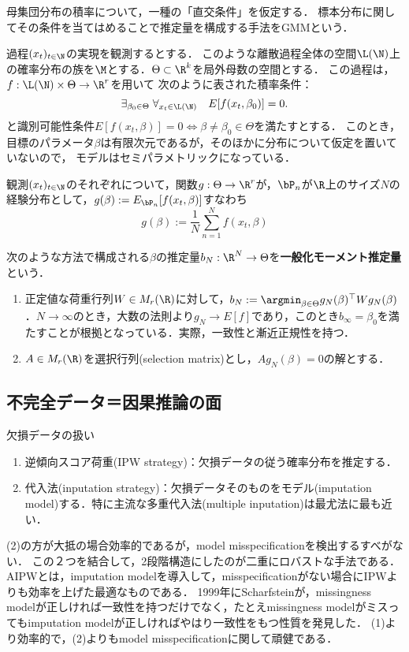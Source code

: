 \documentclass[uplatex,dvipdfmx]{jsreport}
\begin{document}
\begin{remarks}
    母集団分布の積率について，一種の「直交条件」を仮定する．
    標本分布に関してその条件を当てはめることで推定量を構成する手法をGMMという\cite{Lars Hansen}．
\end{remarks}

\begin{notation}
    過程$(x_t)_{t\in\N}$の実現を観測するとする．
    このような離散過程全体の空間$\L(\N)$上の確率分布の族を$\M$とする．$\Theta\subset\R^k$を局外母数の空間とする．
    この過程は，$f:\L(\N)\times\Theta\to\R^r$を用いて
    次のように表された積率条件：
    \[\exists_{\beta_0\in\Theta}\;\forall_{x_t\in\L(\N)}\quad E[f(x_t,\beta_0)]=0.\]
    と識別可能性条件$E[f(x_t,\beta)]=0\Leftrightarrow\beta\ne\beta_0\in\Theta$を満たすとする．
    このとき，目標のパラメータ$\beta$は有限次元であるが，そのほかに分布について仮定を置いていないので，
    モデルはセミパラメトリックになっている．

    観測$(x_t)_{t\in\N}$のそれぞれについて，関数$g:\Theta\to\R^r$が，$\bP_n$が$\R$上のサイズ$N$の経験分布として，$g(\beta):=E_{\bP_n}[f(x_t,\beta)]$すなわち
    \[g(\beta):=\frac{1}{N}\sum_{n=1}^Nf(x_t,\beta)\]
\end{notation}

\begin{definition}
    次のような方法で構成される$\beta$の推定量$b_N:\R^N\to\Theta$を\textbf{一般化モーメント推定量}という．
    \begin{enumerate}
        \item 正定値な荷重行列$W\in M_r(\R)$に対して，$b_N:=\argmin_{\beta\in\Theta}g_N(\beta)^\top Wg_N(\beta)$．$N\to\infty$のとき，大数の法則より$g_N\to E[f]$であり，このとき$b_\infty=\beta_0$を満たすことが根拠となっている．実際，一致性と漸近正規性を持つ．
        \item $A\in M_r(\R)$を選択行列(selection matrix)とし，$Ag_N(\beta)=0$の解とする．
    \end{enumerate}
\end{definition}

\subsection{不完全データ＝因果推論の面}

欠損データの扱い
\begin{enumerate}
    \item 逆傾向スコア荷重(IPW strategy)：欠損データの従う確率分布を推定する．
    \item 代入法(inputation strategy)：欠損データそのものをモデル(imputation model)する．特に主流な多重代入法(multiple inputation)は最尤法に最も近い．
\end{enumerate}
(2)の方が大抵の場合効率的であるが，model misspecificationを検出するすべがない．
この２つを結合して，2段階構造にしたのが二重にロバストな手法である．
AIPWとは，imputation modelを導入して，misspecificationがない場合にIPWよりも効率を上げた最適なものである．
1999年にScharfsteinが，missingness modelが正しければ一致性を持つだけでなく，たとえmissingness modelがミスってもimputation modelが正しければやはり一致性をもつ性質を発見した．
(1)より効率的で，(2)よりもmodel misspecificationに関して頑健である．
\end{document}
